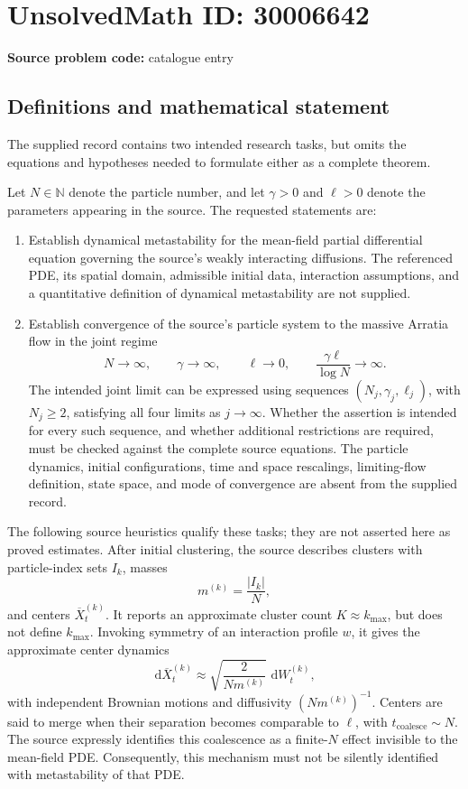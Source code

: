 \documentclass[11pt]{article}
\newcommand{\N}{\mathbb{N}}
\newcommand{\dd}{\,\mathrm{d}}
\begin{document}
\section*{UnsolvedMath ID: 30006642}
\textbf{Source problem code:} catalogue entry
\subsection{Definitions and mathematical statement}
The supplied record contains two intended research tasks, but omits the equations and hypotheses needed to formulate either as a complete theorem.

Let \(N\in\N\) denote the particle number, and let \(\gamma>0\) and \(\ell>0\) denote the parameters appearing in the source. The requested statements are:
\begin{enumerate}
\item Establish dynamical metastability for the mean-field partial differential equation governing the source's weakly interacting diffusions. The referenced PDE, its spatial domain, admissible initial data, interaction assumptions, and a quantitative definition of dynamical metastability are not supplied.
\item Establish convergence of the source's particle system to the massive Arratia flow in the joint regime
\[
N\longrightarrow\infty,\qquad
\gamma\longrightarrow\infty,\qquad
\ell\longrightarrow0,\qquad
\frac{\gamma\ell}{\log N}\longrightarrow\infty.
\]
The intended joint limit can be expressed using sequences \((N_j,\gamma_j,\ell_j)\), with \(N_j\geq2\), satisfying all four limits as \(j\to\infty\). Whether the assertion is intended for every such sequence, and whether additional restrictions are required, must be checked against the complete source equations. The particle dynamics, initial configurations, time and space rescalings, limiting-flow definition, state space, and mode of convergence are absent from the supplied record.
\end{enumerate}

The following source heuristics qualify these tasks; they are not asserted here as proved estimates. After initial clustering, the source describes clusters with particle-index sets \(I_k\), masses
\[
m^{(k)}=\frac{|I_k|}{N},
\]
and centers \(\overline X_t^{(k)}\). It reports an approximate cluster count \(K\approx k_{\max}\), but does not define \(k_{\max}\). Invoking symmetry of an interaction profile \(w\), it gives the approximate center dynamics
\[
\dd\overline X_t^{(k)}
\approx\sqrt{\frac{2}{N m^{(k)}}}\,\dd W_t^{(k)},
\]
with independent Brownian motions and diffusivity \((Nm^{(k)})^{-1}\). Centers are said to merge when their separation becomes comparable to \(\ell\), with \(t_{\mathrm{coalesce}}\sim N\). The source expressly identifies this coalescence as a finite-\(N\) effect invisible to the mean-field PDE. Consequently, this mechanism must not be silently identified with metastability of that PDE.
\end{document}
